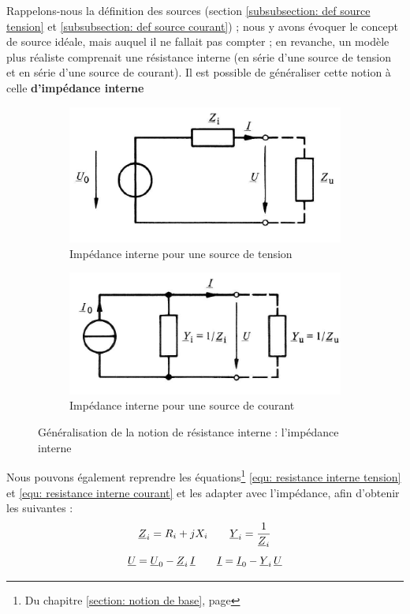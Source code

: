 \documentclass[12pt,a4paper]{article}
\newcommand{\uz}{\uline{Z} }
\newcommand{\uy}{\uline{Y} }
\newcommand{\uu}{\uline{U} }
\begin{document}
 Rappelons-nous la définition des sources (section \ref{subsubsection: def source tension} et \ref{subsubsection: def source courant}) ; nous y avons évoquer le concept de source idéale, mais auquel il ne fallait pas compter ; en revanche, un modèle plus réaliste comprenait une résistance interne (en série d'une source de tension et en série d'une source de courant). Il est possible de généraliser cette notion à celle \textbf{d'impédance interne}
\begin{figure}%
	\centering
	\captionsetup{justification=centering}
	\begin{subfigure}[b]{0.45\textwidth}
		\centering
		\includegraphics[scale=0.5]{images/source_tension_impedance}
		\caption{Impédance interne pour une source de tension}
	\end{subfigure}
	\begin{subfigure}[b]{0.45\textwidth}
		\centering
		\includegraphics[scale=0.5]{images/source_courant_impedance}
		\caption{Impédance interne pour une source de courant}
	\end{subfigure}
	\caption{Généralisation de la notion de résistance interne : l'impédance interne}
	\label{figs: source impedance interne}
\end{figure}

Nous pouvons également reprendre les équations\footnote{Du chapitre \ref{section: notion de base}, page \pageref{equ: resistance interne courant}} \ref{equ: resistance interne tension} et \ref{equ: resistance interne courant} et les adapter avec l'impédance, afin d'obtenir les suivantes :
\[\uz_i = R_i + jX_i\qquad \uy_i = \frac{1}{\uz_i}\]
\begin{equation}	
	\uu = \uu_0 - \uz_i \, \uline{I} \qquad \uline{I} = \uline{I}_0 - \uy_i \, \uu
\end{equation}
\end{document}
